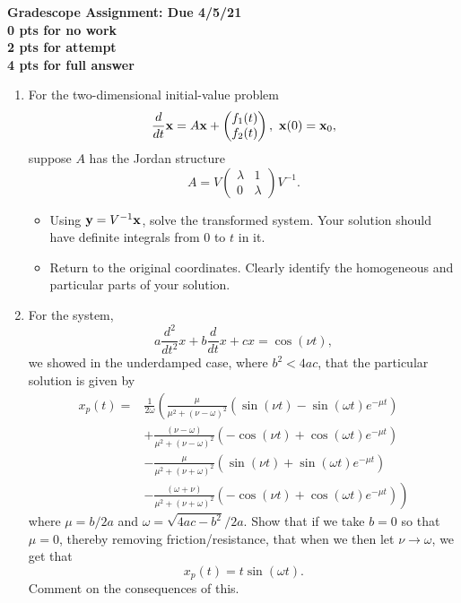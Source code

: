 \documentclass[a4paper,11pt]{article}
\newcommand{\bp}{\begin{pmatrix}}
\newcommand{\ep}{\end{pmatrix}}
\begin{document}
\begin{center}
{\bf Gradescope Assignment: Due 4/5/21\\
0 pts for no work\\ 2 pts for attempt\\ 4 pts for full answer}
\end{center}

\begin{enumerate}
\item For the two-dimensional initial-value problem
\[
\frac{d}{dt}{\bf x} = A{\bf x} + \bp f_{1}(t) \\ f_{2}(t) \ep, ~ {\bf x}(0) = {\bf x}_{0},
\]
suppose $A$ has the Jordan structure
\[
A = V\bp \lambda & 1 \\ 0 & \lambda \ep V^{-1}.
\]
\begin{itemize}
\item Using ${\bf y} = V^{-1}{\bf x}$, solve the transformed system.  Your solution should have definite integrals from $0$ to $t$ in it.  
\item Return to the original coordinates. Clearly identify the homogeneous and particular parts of your solution.  
\end{itemize}
\item For the system,
\[
a\frac{d^{2}}{dt^{2}}x + b \frac{d}{dt}x + c x = \cos(\nu t),
\]
we showed in the underdamped case, where $b^{2}<4ac$, that the particular solution is given by 
\begin{align*}
x_{p}(t) = & \frac{1}{2\omega}\left(\frac{\mu}{\mu^{2}+(\nu-\omega)^{2}}\left(\sin(\nu t) - \sin(\omega t)e^{-\mu t}\right) \right. \\
& + \frac{(\nu-\omega)}{\mu^{2}+(\nu-\omega)^{2}}\left(-\cos(\nu t) + \cos(\omega t)e^{-\mu t}\right) \\
& - \frac{\mu}{\mu^{2}+(\nu+\omega)^{2}}\left(\sin(\nu t) + \sin(\omega t)e^{-\mu t}\right) \\
& \left. - \frac{(\omega+\nu)}{\mu^{2}+(\nu+\omega)^{2}}\left(-\cos(\nu t) + \cos(\omega t)e^{-\mu t}\right) \right)
\end{align*}
where $\mu=b/2a$ and $\omega = \sqrt{4ac-b^{2}}/2a$.  Show that if we take $b=0$ so that $\mu = 0$, thereby removing friction/resistance, that when we then let $\nu \rightarrow \omega$, we get that 
\[
x_{p}(t) = t\sin(\omega t).
\] 
Comment on the consequences of this.  
\end{enumerate}
\end{document}

